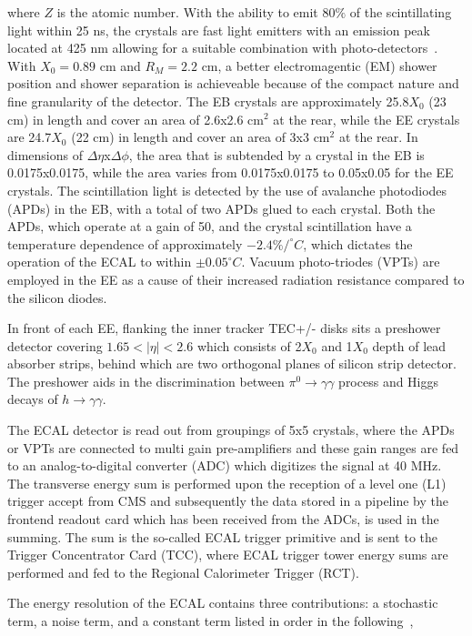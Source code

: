 where $Z$ is the atomic number. With the ability to emit $80\%$ of the scintillating light within 25 ns, the crystals are fast light emitters with an emission peak located at 425 nm allowing for a suitable combination with photo-detectors~\cite{Cockerill:2008td}. With $X_0 = 0.89$ cm and $R_M=2.2$ cm, a better electromagentic (EM) shower position and shower separation is achieveable because of the compact nature and fine granularity of the detector. The EB crystals are approximately 25.8$X_0$ (23 cm) in length and cover an area of 2.6x2.6 cm$^2$ at the rear, while the EE crystals are 24.7$X_0$ (22 cm) in length and cover an area of 3x3 cm$^2$ at the rear. In dimensions of $\Delta\eta$x$\Delta\phi$, the area that is subtended by a crystal in the EB is 0.0175x0.0175, while the area varies from 0.0175x0.0175 to 0.05x0.05 for the EE crystals. The scintillation light is detected by the use of avalanche photodiodes (APDs) in the EB, with a total of two APDs glued to each crystal. Both the APDs, which operate at a gain of 50, and the crystal scintillation have a temperature dependence of approximately $-2.4\%/^{\circ} C$, which dictates the operation of the ECAL to within $\pm0.05^{\circ} C$. Vacuum photo-triodes (VPTs) are employed in the EE as a cause of their increased radiation resistance compared to the silicon diodes. 

In front of each EE, flanking the inner tracker TEC+/- disks sits a preshower detector covering $1.65<|\eta|<2.6$ which consists of 2$X_0$ and 1$X_0$ depth of lead absorber strips, behind which are two orthogonal planes of silicon strip detector. The preshower aids in the discrimination between $\pi^0\rightarrow\gamma\gamma$ process and Higgs decays of $h\rightarrow\gamma\gamma$.

The ECAL detector is read out from groupings of 5x5 crystals, where the APDs or VPTs are connected to multi gain pre-amplifiers and these gain ranges are fed to an analog-to-digital converter (ADC) which digitizes the signal at 40 MHz. The transverse energy sum is performed upon the reception of a level one (L1) trigger accept from CMS and subsequently the data stored in a pipeline by the frontend readout card which has been received from the ADCs, is used in the summing. The sum is the so-called ECAL trigger primitive and is sent to the Trigger Concentrator Card (TCC), where ECAL trigger tower energy sums are performed and fed to the Regional Calorimeter Trigger (RCT).

The energy resolution of the ECAL contains three contributions: a stochastic term, a noise term, and a constant term listed in order in the following~\cite{Chatrchyan:2013dga},

